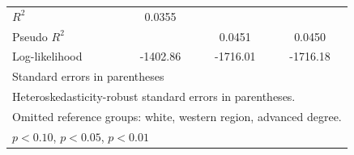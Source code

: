 \begin{table}[htbp]
\begin{tabular}{l*{3}{c}}
$R^2$               &      0.0355         &                     &                     \\
Pseudo $R^2$        &                     &      0.0451         &      0.0450         \\
Log-likelihood      &    -1402.86         &    -1716.01         &    -1716.18         \\
\bottomrule
\multicolumn{4}{l}{\footnotesize Standard errors in parentheses}\\
\multicolumn{4}{l}{\footnotesize Heteroskedasticity-robust standard errors in parentheses.}\\
\multicolumn{4}{l}{\footnotesize Omitted reference groups: white, western region, advanced degree.}\\
\multicolumn{4}{l}{\footnotesize \sym{*} \(p<0.10\), \sym{**} \(p<0.05\), \sym{***} \(p<0.01\)}\\
\end{tabular}
\end{table}

